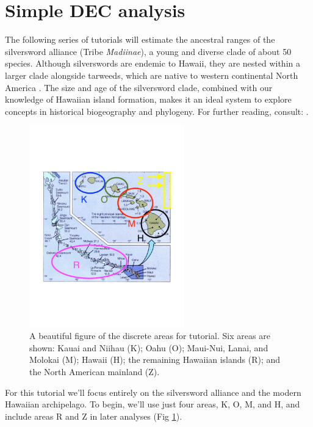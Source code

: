 

\section{Simple DEC analysis} \label{sec:bg_simple}


The following series of tutorials will estimate the ancestral ranges of the silversword alliance (Tribe {\it Madiinae}), a young and diverse clade of about 50 species.
Although silverswords are endemic to Hawaii, they are nested within a larger clade alongside tarweeds, which are native to western continental North America \citep{Baldwin1991}.
The size and age of the silversword clade, combined with our knowledge of Hawaiian island formation, makes it an ideal system to explore concepts in historical biogeography and phylogeny.
For further reading, consult: \citet{Carlquist1959, Baldwin1998}.
 
\begin{figure}[!ht]
\centering
\includegraphics[width=0.6\textwidth]{figures/fig_hawaii_areas.pdf}
\caption{A beautiful figure of the discrete areas for tutorial. Six areas are shown: Kauai and Niihau (K); Oahu (O); Maui-Nui, Lanai, and Molokai (M); Hawaii (H); the remaining Hawaiian islands (R); and the North American mainland (Z).}
\label{fig:hawaii_areas}
\end{figure}
 
For this tutorial we'll focus entirely on the silversword alliance and the modern Hawaiian archipelago.
To begin, we'll use just four areas, K, O, M, and H, and include areas R and Z in later analyses (Fig \ref{fig:hawaii_areas}).


